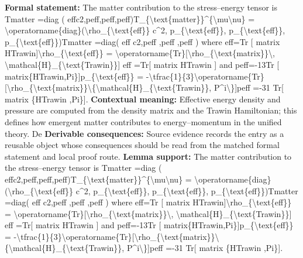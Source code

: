 \begingroup\footnotesize\setlength{\emergencystretch}{3em}\sloppy
\textbf{Formal statement:} The matter contribution to the stress--energy tensor is Tmatter  =diag ( effc2,peff,peff,peff)T\_\{\textbackslash{}text\{matter\}\}\textasciicircum{}\{\textbackslash{}mu\textbackslash{}nu\} = \textbackslash{}operatorname\{diag\}(\textbackslash{}rho\_\{\textbackslash{}text\{eff\}\} c\textasciicircum{}2, p\_\{\textbackslash{}text\{eff\}\}, p\_\{\textbackslash{}text\{eff\}\}, p\_\{\textbackslash{}text\{eff\}\})Tmatter   =diag( eff c2,peff ,peff ,peff ) where  eff=Tr [ matrix HTrawin]\textbackslash{}rho\_\{\textbackslash{}text\{eff\}\} = \textbackslash{}operatorname\{Tr\}[\textbackslash{}rho\_\{\textbackslash{}text\{matrix\}\}\textbackslash{}, \textbackslash{}mathcal\{H\}\_\{\textbackslash{}text\{Trawin\}\}] eff =Tr[ matrix HTrawin ] and peff=-13Tr [ matrix\{HTrawin,Pi\}]p\_\{\textbackslash{}text\{eff\}\} = -\textbackslash{}tfrac\{1\}\{3\}\textbackslash{}operatorname\{Tr\}[\textbackslash{}rho\_\{\textbackslash{}text\{matrix\}\}\textbackslash{}\{\textbackslash{}mathcal\{H\}\_\{\textbackslash{}text\{Trawin\}\}, P\textasciicircum{}i\textbackslash{}\}]peff =-31 Tr[ matrix \{HTrawin ,Pi\}].
\textbf{Contextual meaning:} Effective energy density and pressure are computed from the density matrix and the Trawin Hamiltonian; this defines how emergent matter contributes to energy--momentum in the unified theory. De
\textbf{Derivable consequences:} Source evidence records the entry as a reusable object whose consequences should be read from the matched formal statement and local proof route.
\textbf{Lemma support:} The matter contribution to the stress--energy tensor is Tmatter  =diag ( effc2,peff,peff,peff)T\_\{\textbackslash{}text\{matter\}\}\textasciicircum{}\{\textbackslash{}mu\textbackslash{}nu\} = \textbackslash{}operatorname\{diag\}(\textbackslash{}rho\_\{\textbackslash{}text\{eff\}\} c\textasciicircum{}2, p\_\{\textbackslash{}text\{eff\}\}, p\_\{\textbackslash{}text\{eff\}\}, p\_\{\textbackslash{}text\{eff\}\})Tmatter   =diag( eff c2,peff ,peff ,peff ) where  eff=Tr [ matrix HTrawin]\textbackslash{}rho\_\{\textbackslash{}text\{eff\}\} = \textbackslash{}operatorname\{Tr\}[\textbackslash{}rho\_\{\textbackslash{}text\{matrix\}\}\textbackslash{}, \textbackslash{}mathcal\{H\}\_\{\textbackslash{}text\{Trawin\}\}] eff =Tr[ matrix HTrawin ] and peff=-13Tr [ matrix\{HTrawin,Pi\}]p\_\{\textbackslash{}text\{eff\}\} = -\textbackslash{}tfrac\{1\}\{3\}\textbackslash{}operatorname\{Tr\}[\textbackslash{}rho\_\{\textbackslash{}text\{matrix\}\}\textbackslash{}\{\textbackslash{}mathcal\{H\}\_\{\textbackslash{}text\{Trawin\}\}, P\textasciicircum{}i\textbackslash{}\}]peff =-31 Tr[ matrix \{HTrawin ,Pi\}].\par
\endgroup

